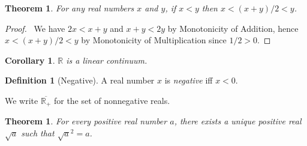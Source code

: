 \documentclass{book}
\let\qed\relax
\newtheorem{cor}{Corollary}[ax]
\newtheorem{thm}[ax]{Theorem}
\theoremstyle{definition}
\newtheorem{df}[ax]{Definition}
\begin{document}
\begin{thm}
For any real numbers $x$ and $y$, if $x < y$ then $x < (x+y)/2 < y$.
\end{thm}

\begin{proof}
\pf\ We have $2x < x+y$ and $x + y < 2y$ by Monotonicity of Addition, hence $x < (x+y)/2 < y$ by Monotonicity of Multiplication since $1/2 > 0$. \qed
\end{proof}

\begin{cor}
$\mathbb{R}$ is a linear continuum.
\end{cor}

\begin{df}[Negative]
A real number $x$ is \emph{negative} iff $x < 0$.

We write $\overline{\mathbb{R}_+}$ for the set of nonnegative reals.
\end{df}

\begin{thm}
For every positive real number $a$, there exists a unique positive real $\sqrt{a}$ such that $\sqrt{a}^2 = a$.
\end{thm}
\end{document}
